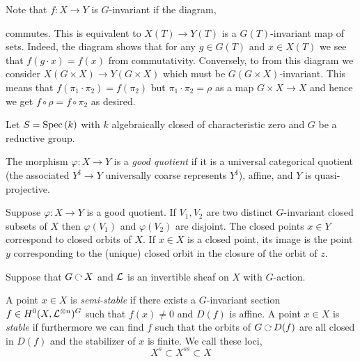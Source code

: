 \documentclass[12pt]{article}
\begin{document}
\begin{rmk}
Note that $f : X \to Y$ is $G$-invariant if the diagram,
\begin{center}
\end{center}
commutes. This is equivalent to $X(T) \to Y(T)$ is a $G(T)$-invariant map of sets. Indeed, the diagram shows that for any $g \in G(T)$ and $x \in X(T)$ we see that $f(g \cdot x) = f(x)$ from commutativity. Conversely, to from this diagram we consider $X(G \times X) \to Y(G \times X)$ which must be $G(G \times X)$-invariant. This means that $f(\pi_1 \cdot \pi_2) = f(\pi_2)$ but $\pi_1 \cdot \pi_2 = \rho$ as a map $G \times X \to X$ and hence we get $f \circ \rho = f \circ \pi_2$ as desired.
\end{rmk}

Let $S = \mathrm{Spec}\left( k \right)$ with $k$ algebraically closed of characteristic zero and $G$ be a reductive group.

\begin{defn}
The morphism $\varphi : X \to Y$ is a \textit{good quotient} if it is a universal categorical quotient (the associated $Y^\sharp \to Y$ universally coarse represents $Y^\sharp$), affine, and $Y$ is quasi-projective.
\end{defn}

\begin{theorem}[Mumford]
Suppose $\varphi : X \to Y$ is a good quotient. If $V_1, V_2$ are two distinct $G$-invariant closed subsets of $X$ then $\varphi(V_1)$ and $\varphi(V_2)$ are disjoint. The closed points $x \in Y$ correspond to closed orbits of $X$. If $x \in X$ is a closed point, its image is the point $y$ corresponding to the (unique) closed orbit in the closure of the orbit of $z$. 
\end{theorem}

Suppose that $G \acts X$ and $\mathcal{L}$ is an invertible sheaf on $X$ with $G$-action. 

\begin{defn}
A point $x \in X$ is \textit{semi-stable} if there exists a $G$-invariant section $f \in H^0(X, \mathcal{L}^{\otimes n})^G$ such that $f(x) \neq 0$ and $D(f)$ is affine. A point $x \in X$ is \textit{stable} if furthermore we can find $f$ such that the orbits of $G \acts D(f)$ are all closed in $D(f)$ and the stabilizer of $x$ is finite. We call these loci,
\[ X^s \subset X^{ss} \subset X \]
\end{defn}
\end{document}
